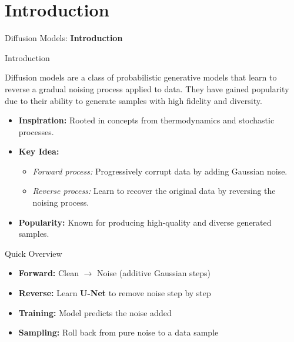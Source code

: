 \section{Introduction}
\begin{frame}{}
    \LARGE Diffusion Models: \textbf{Introduction}
\end{frame}

\begin{frame}{Introduction}

Diffusion models are a class of probabilistic generative models that learn to reverse a gradual noising process applied to data. They have gained popularity due to their ability to generate samples with high fidelity and diversity.

\begin{itemize}
    \item<2-> \textbf{Inspiration:} Rooted in concepts from thermodynamics and stochastic processes.
    \item<3-> \textbf{Key Idea:} 
    \begin{itemize}
        \item \textit{Forward process:} Progressively corrupt data by adding Gaussian noise.
        \item \textit{Reverse process:} Learn to recover the original data by reversing the noising process.
    \end{itemize}
    \item<4-> \textbf{Popularity:} Known for producing high-quality and diverse generated samples.
\end{itemize}
\end{frame}

\begin{frame}{Quick Overview}
    \begin{itemize}
        \item \textbf{Forward:} Clean $\rightarrow$ Noise (additive Gaussian steps)
        \item \textbf{Reverse:} Learn \textbf{U-Net} to remove noise step by step
        \item \textbf{Training:} Model predicts the noise added
        \item \textbf{Sampling:} Roll back from pure noise to a data sample
    \end{itemize}
\end{frame}